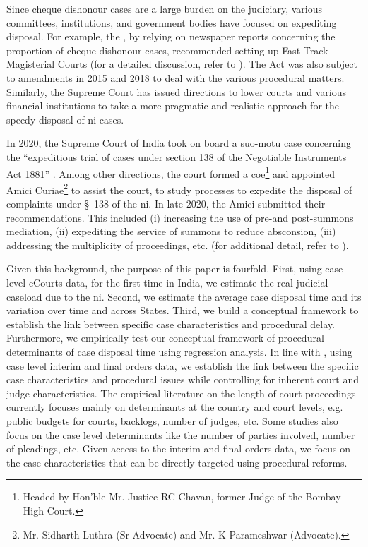 \documentclass[12pt,a4paper]{article}
\begin{document}
Since cheque dishonour cases are a large burden on the judiciary, various committees, institutions, and government bodies have focused on expediting disposal. For example, the \cite{lci2008_138}, by relying on newspaper reports concerning the proportion of cheque dishonour cases, recommended setting up Fast Track Magisterial Courts (for a detailed discussion, refer to \cite{bhan2015_placing}). The Act was also subject to amendments in 2015 and 2018 to deal with the various procedural matters. Similarly, the Supreme Court has issued directions to lower courts and various financial institutions to take a more pragmatic and realistic approach for the speedy disposal of \gls{ni} cases.

In 2020, the Supreme Court of India took on board a suo-motu case concerning the “expeditious trial of cases under section 138 of the Negotiable Instruments Act 1881” \autocite{sc2020_138}. Among other directions, the court formed a \gls{coe}\footnote{Headed by Hon’ble Mr. Justice RC Chavan, former Judge of the Bombay High Court.} and appointed Amici Curiae\footnote{Mr. Sidharth Luthra (Sr Advocate) and Mr. K Parameshwar (Advocate).} to assist the court, to study processes to expedite the disposal of complaints under \S~138 of the \gls{ni}. In late 2020, the Amici submitted their recommendations. This included (i) increasing the use of pre-and post-summons mediation, (ii) expediting the service of summons to reduce absconsion, (iii) addressing the multiplicity of proceedings, etc. (for additional detail, refer to \cite{amicus2020_submission}).

Given this background, the purpose of this paper is fourfold. First, using case level eCourts data, for the first time in India, we estimate the real judicial caseload due to the \gls{ni}. Second, we estimate the average case disposal time and its variation over time and across States. Third, we build a conceptual framework to establish the link between specific case characteristics and procedural delay. Furthermore, we empirically test our conceptual framework of procedural determinants of case disposal time using regression analysis. In line with \cite{bielen2015}, using case level interim and final orders data, we establish the link between the specific case characteristics and procedural issues while controlling for inherent court and judge characteristics. The empirical literature on the length of court proceedings currently focuses mainly on determinants at the country and court levels, e.g. public budgets for courts, backlogs, number of judges, etc. Some studies also focus on the case level determinants like the number of parties involved, number of pleadings, etc. Given access to the interim and final orders data, we focus on the case characteristics that can be directly targeted using procedural reforms.
\end{document}
